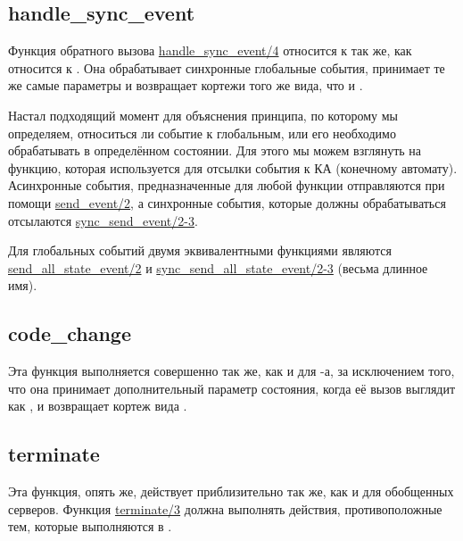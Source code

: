\subsection{handle\_sync\_event}
\label{handle-sync-event}
Функция обратного вызова \href{http://erldocs.com/R15B/stdlib/gen\_fsm.html\#handle\_sync\_event/4}{handle\_sync\_event/4} относится к  так же, как  относится к .
Она обрабатывает синхронные глобальные события, принимает те же самые параметры и возвращает кортежи того же вида, что и .

Настал подходящий момент для объяснения принципа, по которому мы определяем, относиться ли событие к глобальным, или его необходимо обрабатывать в определённом состоянии.
Для этого мы можем взглянуть на функцию, которая используется для отсылки события к КА (конечному автомату).
Асинхронные события, предназначенные для любой функции  отправляются при помощи \href{http://erldocs.com/R15B/stdlib/gen\_fsm.html\#send\_event/2}{send\_event/2}, а синхронные события, которые должны обрабатываться  отсылаются \href{http://erldocs.com/R15B/stdlib/gen\_fsm.html\#sync\_send\_event/2}{sync\_send\_event/2-3}.

Для глобальных событий двумя эквивалентными функциями являются \href{http://erldocs.com/R15B/stdlib/gen\_fsm.html\#send\_all\_state\_event/2}{send\_all\_state\_event/2} и \href{http://erldocs.com/R15B/stdlib/gen\_fsm.html\#sync\_send\_all\_state\_event/2}{sync\_send\_all\_state\_event/2-3} (весьма длинное имя).

\subsection{code\_change}
\label{code-change-2}
Эта функция выполняется совершенно так же, как и для \--а, за исключением того, что она принимает дополнительный параметр состояния, когда её вызов выглядит как , и возвращает кортеж вида .

\subsection{terminate}
\label{terminate-2}
Эта функция, опять же, действует приблизительно так же, как и для обобщенных серверов.
Функция \href{http://erldocs.com/R15B/stdlib/gen\_fsm.html\#terminate/3}{terminate/3} должна выполнять действия, противоположные тем, которые выполняются в .

